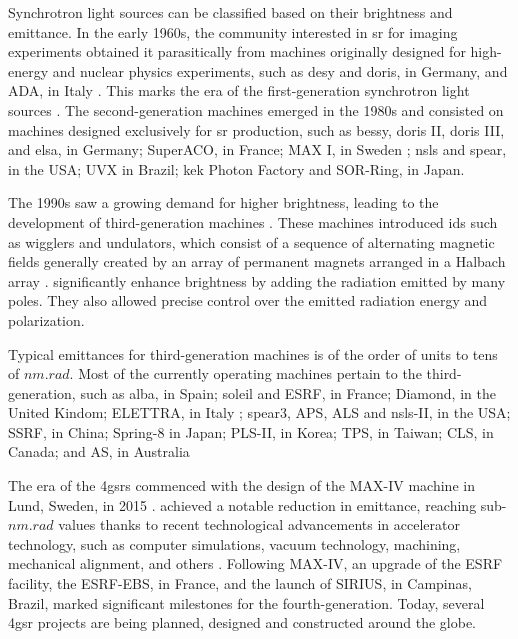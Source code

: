 Synchrotron light sources can be classified based on their brightness and emittance. In the early 1960s, the community interested in \gls*{sr} for imaging experiments obtained it parasitically from machines originally designed for high-energy and nuclear physics experiments, such as \acrshort*{desy} and \acrshort*{doris}, in Germany, and ADA, in Italy \cite{simoulin_synchrotron_2016}. This marks the era of the first-generation synchrotron light sources \cite{liu_towards_2017}. The second-generation machines emerged in the 1980s and consisted on machines designed exclusively for \gls*{sr} production, such as \acrshort*{bessy}, \acrshort*{doris} II, \acrshort*{doris} III, and \acrshort*{elsa}, in Germany; \gls*{SuperACO}, in France; MAX I, in Sweden \cite{simoulin_synchrotron_2016}; \acrshort*{nsls} and \acrshort*{spear}, in the USA; \gls*{UVX} in Brazil; \gls*{kek} Photon Factory and \gls*{SOR-Ring}, in Japan.

The 1990s saw a growing demand for higher brightness, leading to the development of third-generation machines \cite{liu_towards_2017}. These machines introduced \glspl*{id} such as wigglers and undulators, which consist of a sequence of alternating magnetic fields generally created by an array of permanent magnets arranged in a Halbach array \cite[chapter 7]{clarke2004science}.  significantly enhance brightness by adding the radiation emitted by many poles. They also allowed precise control over the emitted radiation energy and polarization.

Typical emittances for third-generation machines is of the order of units to tens of $\unit{nm}.\unit{rad}$. Most of the currently operating machines pertain to the third-generation, such as \gls*{alba}, in Spain; \acrshort*{soleil} and \acrshort*{ESRF}, in France; Diamond, in the United Kindom; \gls*{ELETTRA}, in Italy \cite{simoulin_synchrotron_2016}; \acrshort*{spear}3, \acrshort*{APS}, \acrshort*{ALS} and \acrshort*{nsls}-II, in the USA; \acrshort*{SSRF}, in China; \acrshort*{Spring-8} in Japan; \acrshort*{PLS}-II, in Korea; \acrshort*{TPS}, in Taiwan; \acrshort*{CLS}, in Canada; and \acrshort*{AS}, in Australia

The era of the \glspl*{4gsr} commenced with the design of the MAX-IV machine in Lund, Sweden, in 2015 \cite{liu_towards_2017,hettel_challenges_2014}.  achieved a notable reduction in emittance, reaching sub-$\unit{nm}.\unit{rad}$ values thanks to recent technological advancements in accelerator technology, such as computer simulations, vacuum technology, machining, mechanical alignment, and others  \cite{hettel_challenges_2014,liu_towards_2017}. Following MAX-IV, an upgrade of the \acrshort*{ESRF} facility, the ESRF-EBS, in France, and the launch of SIRIUS, in Campinas, Brazil, marked significant milestones for the fourth-generation. Today, several \gls*{4gsr} projects are being planned, designed and constructed around the globe.

